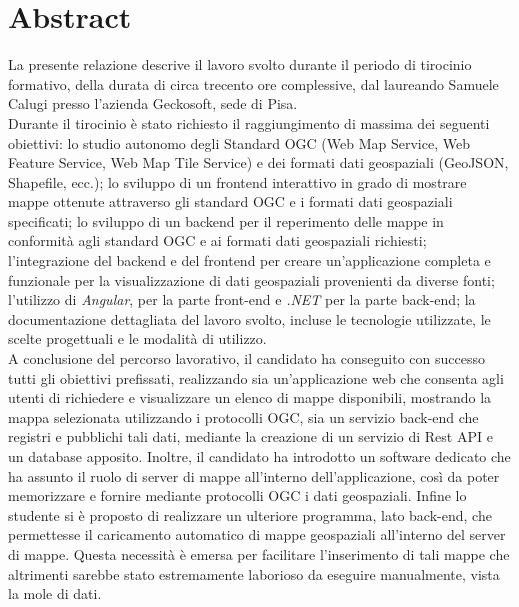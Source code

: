 \cleardoublepage{}
\begingroup
\let\clearpage\relax
\let\cleardoublepage\relax
\let\cleardoublepage\relax

\chapter*{Abstract}

La presente relazione descrive il lavoro svolto durante il periodo di tirocinio formativo, della durata di circa trecento ore complessive, dal laureando Samuele Calugi presso l'azienda Geckosoft, sede di Pisa. 
\\Durante il tirocinio è stato richiesto il raggiungimento di massima dei seguenti obiettivi: lo studio autonomo degli Standard OGC (Web Map Service, Web Feature Service, Web Map Tile Service) e dei formati dati geospaziali (GeoJSON, Shapefile, ecc.); lo sviluppo di un frontend interattivo in grado di mostrare mappe ottenute attraverso gli standard OGC e i formati dati geospaziali specificati; lo sviluppo di un backend per il reperimento delle mappe in conformità agli standard OGC e ai formati dati geospaziali richiesti; l'integrazione del backend e del frontend per creare un'applicazione completa e funzionale per la visualizzazione di dati geospaziali provenienti da diverse fonti; l'utilizzo di \textit{Angular}, per la parte front-end e \textit{.NET} per la parte back-end; la documentazione dettagliata del lavoro svolto, incluse le tecnologie utilizzate, le scelte progettuali e le modalità di utilizzo.
\\A conclusione del percorso lavorativo, il candidato ha conseguito con successo tutti gli obiettivi prefissati, realizzando sia un'applicazione web che consenta agli utenti di richiedere e visualizzare un elenco di mappe disponibili, mostrando la mappa selezionata utilizzando i protocolli OGC, sia un servizio back-end che registri e pubblichi tali dati, mediante la creazione di un servizio di Rest API e un database apposito. Inoltre, il candidato ha introdotto un software dedicato che ha assunto il ruolo di server di mappe all'interno dell'applicazione, così da poter memorizzare e fornire mediante protocolli OGC i dati geospaziali. Infine lo studente si è proposto di realizzare un ulteriore programma, lato back-end, che permettesse il caricamento automatico di mappe geospaziali all'interno del server di mappe. Questa necessità è emersa per facilitare l'inserimento di tali mappe che altrimenti sarebbe stato estremamente laborioso da eseguire manualmente, vista la mole di dati.

\endgroup

\vfill